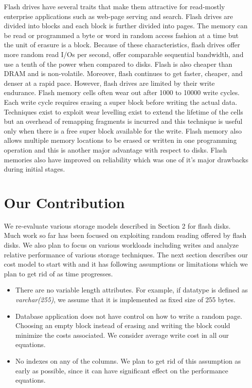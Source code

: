 \documentclass[twocolumn,11pt]{article}
\begin{document}
Flash drives have several traits that make them attractive for read-mostly
enterprise applications such as web-page serving and search. 
Flash drives are divided into blocks and each block is further divided into pages.
The memory can be read or programmed a byte or word in random access
fashion at a time but the unit of erasure is a block. Because of these 
characteristics, flash drives offer more random read I/Os per second, offer comparable
sequential bandwidth, and use a tenth of the power when compared to disks.
Flash is also cheaper than DRAM and is non-volatile. Moreover, flash
continues to get faster, cheaper, and denser at a rapid pace. However,
flash drives are limited by their write endurance. Flash memory cells
often wear out after 1000 to 10000 write cycles. Each write cycle requires
erasing a super block before writing the actual data. Techniques exist
to exploit wear levelling exist to extend the lifetime of the cells but
an overhead of remapping fragments is incurred and this technique is
useful only when there is a free super block available for the write.
Flash memory also allows multiple memory locations to be erased or
written in one programming operation and this is another major
advantage with respect to disks. Flash memories also have improved on reliability
which was one of it's major drawbacks during initial stages.

\section{Our Contribution}

We re-evaluate various storage models described in Section 2 for flash disks.
Much work so far has been focused on exploiting random reading offered by
flash disks. We also plan to focus on various workloads including writes
and analyze relative performance of various storage techniques. The next
section describes our cost model to start with and it has following
assumptions or limitations which we plan to get rid of as time
progresses.
\begin{itemize}
	\item There are no variable length attributes. For example, if datatype is defined
	as {\em varchar(255)}, we assume that it is implemented as fixed size of 255 bytes.
	\item Database application does not have control on how to write a random page. 
	Choosing an empty block instead of erasing and writing the block could minimize
	the costs associated. We consider average write cost in all our equations.
	\item No indexes on any of the columns. We plan to get rid of this assumption
	as early as possible, since it can have significant effect on the performance equations.
\end{itemize}
\end{document}
